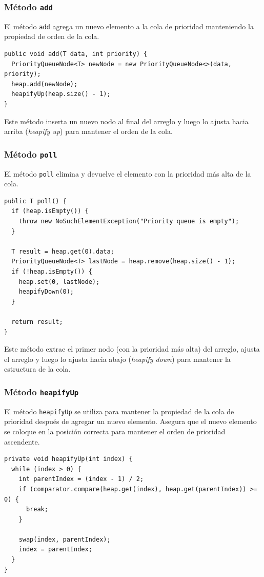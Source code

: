\documentclass[10pt, a4paper]{article}
\newcommand{\mj}[1]{\texttt{#1}}
\begin{document}
\subsubsection{Método \mj{add}}

El método \mj{add} agrega un nuevo elemento a la cola de prioridad manteniendo la propiedad de orden de la cola.

\begin{verbatim}
public void add(T data, int priority) {
  PriorityQueueNode<T> newNode = new PriorityQueueNode<>(data, priority);
  heap.add(newNode);
  heapifyUp(heap.size() - 1);
}
\end{verbatim}

Este método inserta un nuevo nodo al final del arreglo y luego lo ajusta hacia arriba (\emph{heapify up}) para mantener el orden de la cola.

\subsubsection{Método \mj{poll}}

El método \mj{poll} elimina y devuelve el elemento con la prioridad más alta de la cola.

\begin{verbatim}
public T poll() {
  if (heap.isEmpty()) {
    throw new NoSuchElementException("Priority queue is empty");
  }

  T result = heap.get(0).data;
  PriorityQueueNode<T> lastNode = heap.remove(heap.size() - 1);
  if (!heap.isEmpty()) {
    heap.set(0, lastNode);
    heapifyDown(0);
  }

  return result;
}
\end{verbatim}

Este método extrae el primer nodo (con la prioridad más alta) del arreglo, ajusta el arreglo y luego lo ajusta hacia abajo (\emph{heapify down}) para mantener la estructura de la cola.

\subsubsection{Método \mj{heapifyUp}}

El método \mj{heapifyUp} se utiliza para mantener la propiedad de la cola de prioridad después de agregar un nuevo elemento. Asegura que el nuevo elemento se coloque en la posición correcta para mantener el orden de prioridad ascendente.

\begin{verbatim}
private void heapifyUp(int index) {
  while (index > 0) {
    int parentIndex = (index - 1) / 2;
    if (comparator.compare(heap.get(index), heap.get(parentIndex)) >= 0) {
      break;
    }

    swap(index, parentIndex);
    index = parentIndex;
  }
}
\end{verbatim}
\end{document}

